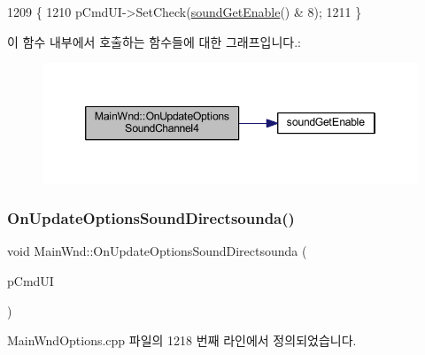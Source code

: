 \begin{DoxyCode}
1209 \{
1210   pCmdUI->SetCheck(\mbox{\hyperlink{_sound_8cpp_a3d1f6129176583804274bb162c3428a8}{soundGetEnable}}() & 8);
1211 \}
\end{DoxyCode}
이 함수 내부에서 호출하는 함수들에 대한 그래프입니다.\+:
\nopagebreak
\begin{figure}[H]
\begin{center}
\leavevmode
\includegraphics[width=346pt]{class_main_wnd_aafd7a1e3f482022ffbb6731f02de0ee1_cgraph}
\end{center}
\end{figure}
\mbox{\label{class_main_wnd_a47d8a1f6079e54d268ff2a19a34aba6e}} 
\subsubsection{\texorpdfstring{On\+Update\+Options\+Sound\+Directsounda()}{OnUpdateOptionsSoundDirectsounda()}}
{\footnotesize\ttfamily void Main\+Wnd\+::\+On\+Update\+Options\+Sound\+Directsounda (\begin{DoxyParamCaption}\item[{C\+Cmd\+UI $\ast$}]{p\+Cmd\+UI }\end{DoxyParamCaption})\hspace{0.3cm}{\ttfamily [protected]}}



Main\+Wnd\+Options.\+cpp 파일의 1218 번째 라인에서 정의되었습니다.


